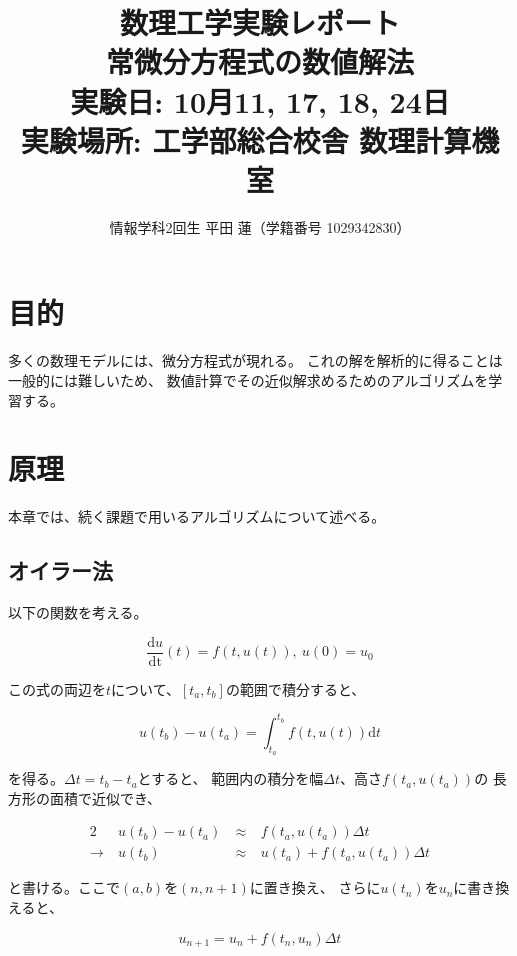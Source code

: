 \documentclass[a4j, titlepage]{jsarticle}
\title{
    数理工学実験レポート \\
    常微分方程式の数値解法 \\
    \large{実験日: 10月11, 17, 18, 24日} \\
    \large{実験場所: 工学部総合校舎 数理計算機室}
}
\author{情報学科2回生 平田 蓮（学籍番号 1029342830）}
\begin{document}
\maketitle

\section{目的}
    多くの数理モデルには、微分方程式が現れる。
    これの解を解析的に得ることは一般的には難しいため、
    数値計算でその近似解求めるためのアルゴリズムを学習する。

\section{原理}
    本章では、続く課題で用いるアルゴリズムについて述べる。

    \subsection{オイラー法}
        以下の関数を考える。

        \begin{equation}
            \frac{\mathrm{d}u}{\mathrm{dt}}(t) = f(t, u(t)), \ u(0) = u_0 \label{equ:diff}
        \end{equation}

        この式の両辺を$t$について、$[t_a, t_b]$の範囲で積分すると、
        
        \begin{equation*}
            u(t_b) - u(t_a) = \int^{t_b}_{t_a}f(t, u(t))\mathrm{d}t
        \end{equation*}

        を得る。$\Delta t = t_b - t_a$とすると、
        範囲内の積分を幅$\Delta t$、高さ$f(t_a, u(t_a))$の
        長方形の面積で近似でき、

        \begin{alignat*}{2}
            & u(t_b) - u(t_a) & \ \approx \ & f(t_a, u(t_a))\Delta t \\
            \rightarrow \ & u(t_b) & \ \approx \ & u(t_a) + f(t_a, u(t_a))\Delta t
        \end{alignat*}

        と書ける。ここで$(a, b)$を$(n, n + 1)$に置き換え、
        さらに$u(t_n)$を$u_n$に書き換えると、

        \begin{equation}
            u_{n + 1} = u_n + f(t_n, u_n)\Delta t
        \end{equation}
\end{document}
